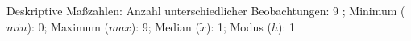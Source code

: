 				\label{tableValues:astu06b}
				\vspace*{-\baselineskip}
                    \begin{noten}
                	    \note{} Deskriptive Maßzahlen:
                	    Anzahl unterschiedlicher Beobachtungen: 9%
                	    ; 
                	      Minimum ($min$): 0; 
                	      Maximum ($max$): 9; 
                	      Median ($\tilde{x}$): 1; 
                	      Modus ($h$): 1
                     \end{noten}

